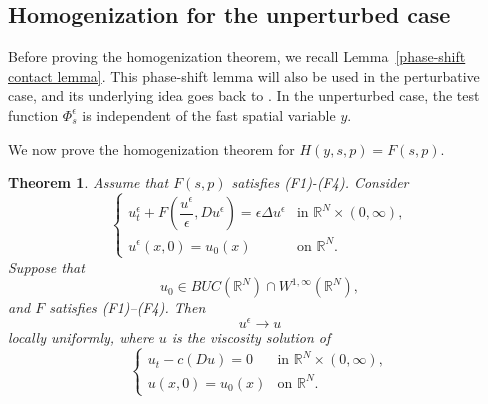 \documentclass[preprint]{elsarticle}
\newtheorem{result}{\textbf{Theorem}}
\numberwithin{equation}{section}
\begin{document}
\subsection{Homogenization for the unperturbed case}
Before proving the homogenization theorem, we recall Lemma~\ref{phase-shift contact lemma}. This phase-shift lemma will also be used in the perturbative case, and its underlying idea goes back to \cite{imbert2008homogenization}. In the unperturbed case, the test function $\Phi^\epsilon_s$ is independent of the fast spatial variable $y$.

We now prove the homogenization theorem for $H(y,s,p)=F(s,p)$.

\begin{result}
 Assume that $F(s,p)$ satisfies (F1)-(F4). Consider
\begin{equation}
\begin{cases}
u_t^\epsilon+F\left(\dfrac{u^\epsilon}{\epsilon},Du^\epsilon\right)
=
\epsilon\Delta u^\epsilon
&\text{in }\mathbb R^N\times(0,\infty),\\[2mm]
u^\epsilon(x,0)=u_0(x)
&\text{on }\mathbb R^N.
\end{cases}
\end{equation}
Suppose that
$$
u_0\in BUC(\mathbb R^N)\cap W^{1,\infty}(\mathbb R^N),
$$
and $F$ satisfies (F1)--(F4). Then
$$
u^\epsilon\to u
$$
locally uniformly, where $u$ is the viscosity solution of
\begin{equation}
\begin{cases}
u_t-c(Du)=0
&\text{in }\mathbb R^N\times(0,\infty),\\
u(x,0)=u_0(x)
&\text{on }\mathbb R^N.
\end{cases}
\end{equation}
\end{result}
\end{document}
